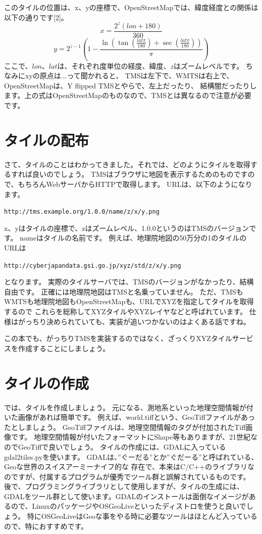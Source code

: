 このタイルの位置は、x、yの座標で、OpenStreetMapでは、緯度経度との関係は以下の通りです[2]。
\[
x = \frac{2^z(lon+180)}{360}
\]
\[
y = 2^{z-1}(1-\frac{\ln(\tan(\frac{lat\pi}{180})+\sec(\frac{lat\pi}{180}))}{\pi})
\]
ここで、$lon$、$lat$は、それぞれ度単位の経度、緯度、$z$はズームレベルです。
ちなみにxyの原点は...って聞かれると、
TMSは左下で、WMTSは右上で、OpenStreetMapは、Y flipped TMSとやらで、左上だったり、
結構闇だったりします。上の式はOpenStreetMapのものなので、TMSとは異なるので注意が必要です。

\section*{タイルの配布}
さて、タイルのことはわかってきました。それでは、どのようにタイルを取得するすれば良いのでしょう。
TMSはブラウザに地図を表示するためのものですので、もちろんWebサーバからHTTPで取得します。
URLは、以下のようになります。
\begin{center}
  \texttt{http://tms.example.org/1.0.0/name/z/x/y.png}
\end{center}

x、yはタイルの座標で、zはズームレベル、1.0.0というのはTMSのバージョンです。
nameはタイルの名前です。
例えば、地理院地図の50万分の1のタイルのURLは
\begin{center}
  \texttt{http://cyberjapandata.gsi.go.jp/xyz/std/z/x/y.png}
\end{center}
となります。
実際のタイルサーバでは、TMSのバージョンがなかったり、結構自由です。
正確には地理院地図はTMSと名乗っていません。
ただ、TMSもWMTSも地理院地図もOpenStreetMapも、URLでXYZを指定してタイルを取得するので
これらを総称してXYZタイルやXYZレイヤなどと呼ばれています。
仕様はがっちり決められていても、実装が追いつかないのはよくある話ですね。

この本でも、がっちりTMSを実装するのではなく、ざっくりXYZタイルサービスを作成することにしましょう。

\section*{タイルの作成}
では、タイルを作成しましょう。
元になる、測地系といった地理空間情報が付いた画像があれば簡単です。
例えば、world.tiffという、GeoTiffファイルがあったとしましょう。
GeoTiffファイルは、地理空間情報のタグが付加されたTiff画像です。
地理空間情報が付いたフォーマットにShape等もありますが、21世紀なのでGeoTiffで良いでしょう。
タイルの作成には、GDALに入っているgdal2tiles.pyを使います。
GDALは、''ぐーだる''とか''ぐだーる''と呼ばれている、Geoな世界のスイスアーミーナイフ的な
存在で、本来はC/C++のライブラリなのですが、付属するプログラムが優秀でツール群と誤解されているものです。
後で、プログラミングライブラリとして使用しますが、タイルの生成には、GDALをツール群として使います。GDALのインストールは面倒なイメージがあるので、LinuxのパッケージやOSGeoLiveといったディストロを使うと良いでしょう。
特にOSGeoLiveはGeoな事をやる時に必要なツールはほとんど入っているので、特におすすめです。

